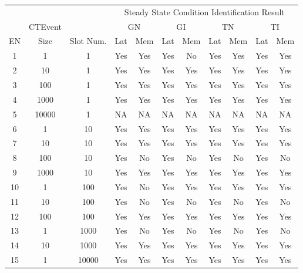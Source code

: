 \begin{table}[htb]
\centering
\scriptsize
 \begin{tabular}{c|c|c|cc|cc|cc|cc}
	  	\hline
	  	&&&\multicolumn{8}{c}{Steady State Condition Identification Result}  \\
	  	&CTEvent&&\multicolumn{2}{c}{GN}|&\multicolumn{2}{c}{GI}|&\multicolumn{2}{c}{TN}|&\multicolumn{2}{c}{TI}  \\
	  	EN&Size& Slot Num.&Lat&Mem&Lat&Mem&Lat&Mem&Lat&Mem  \\
		\hline
		\hline
		 1&1&1&Yes&Yes&Yes&No&Yes&Yes&Yes&Yes\\
		 2&10&1&Yes&Yes&Yes&Yes&Yes&Yes&Yes&Yes\\
		 3&100&1&Yes&Yes&Yes&Yes&Yes&Yes&Yes&Yes\\
		 4&1000&1&Yes&Yes&Yes&Yes&Yes&Yes&Yes&Yes\\
		 5&10000&1&NA&NA&NA&NA&NA&NA&NA&NA\\
		 6&1&10&Yes&Yes&Yes&Yes&Yes&Yes&Yes&Yes\\
		 7&10&10&Yes&Yes&Yes&Yes&Yes&Yes&Yes&Yes\\
		 8&100&10&Yes&No&Yes&No&Yes&No&Yes&No\\
		 9&1000&10&Yes&Yes&Yes&Yes&Yes&Yes&Yes&Yes\\
		 10&1&100&Yes&No&Yes&Yes&Yes&Yes&Yes&Yes\\
		 11&10&100&Yes&No&Yes&No&Yes&No&Yes&No\\
		 12&100&100&Yes&Yes&Yes&Yes&Yes&Yes&Yes&Yes\\
		 13&1&1000&Yes&No&Yes&No&Yes&No&Yes&No\\
		 14&10&1000&Yes&Yes&Yes&Yes&Yes&Yes&Yes&Yes\\
		 15&1&10000&Yes&Yes&Yes&Yes&Yes&Yes&Yes&Yes\\

		\hline 
 \end{tabular}


\end{table}
